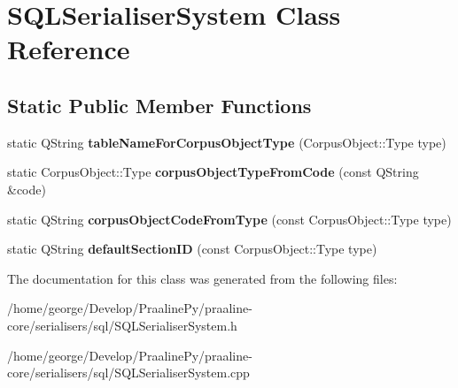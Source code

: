 \hypertarget{class_s_q_l_serialiser_system}{}\section{S\+Q\+L\+Serialiser\+System Class Reference}
\label{class_s_q_l_serialiser_system}
\subsection*{Static Public Member Functions}
\begin{DoxyCompactItemize}
\item 
\mbox{\label{class_s_q_l_serialiser_system_aea6079dbcea3865988937821bd915898}} 
static Q\+String {\bfseries table\+Name\+For\+Corpus\+Object\+Type} (Corpus\+Object\+::\+Type type)
\item 
\mbox{\label{class_s_q_l_serialiser_system_a2cb8584d47662c9b5f09526edc1133e1}} 
static Corpus\+Object\+::\+Type {\bfseries corpus\+Object\+Type\+From\+Code} (const Q\+String \&code)
\item 
\mbox{\label{class_s_q_l_serialiser_system_a4d7508c776f7c10e506c27706f72080e}} 
static Q\+String {\bfseries corpus\+Object\+Code\+From\+Type} (const Corpus\+Object\+::\+Type type)
\item 
\mbox{\label{class_s_q_l_serialiser_system_ab3545e266c456f3e9f6c2edbaeb6f51b}} 
static Q\+String {\bfseries default\+Section\+ID} (const Corpus\+Object\+::\+Type type)
\end{DoxyCompactItemize}


The documentation for this class was generated from the following files\+:\begin{DoxyCompactItemize}
\item 
/home/george/\+Develop/\+Praaline\+Py/praaline-\/core/serialisers/sql/S\+Q\+L\+Serialiser\+System.\+h\item 
/home/george/\+Develop/\+Praaline\+Py/praaline-\/core/serialisers/sql/S\+Q\+L\+Serialiser\+System.\+cpp\end{DoxyCompactItemize}

